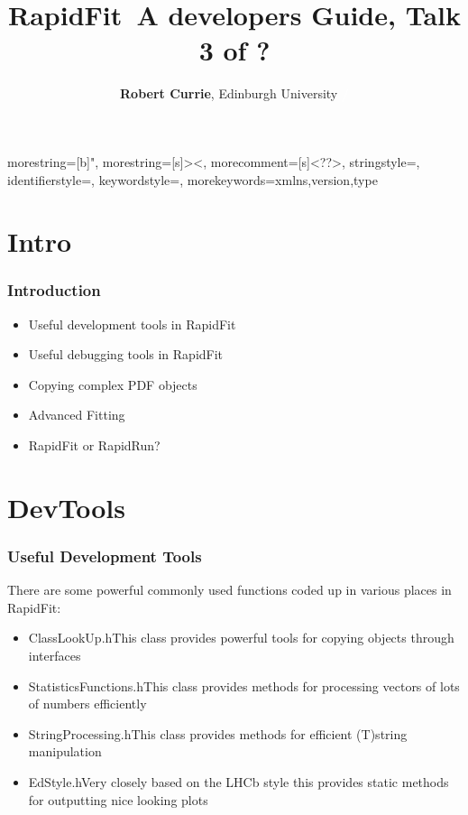 \documentclass{beamer}
\title{\textbf{RapidFit}\newline~A developers Guide, Talk 3 of ?}
\author{\textbf{Robert Currie}, Edinburgh University\newline\hspace{.5cm} \textcolor{white}{\textbf{\insertframenumber \vspace{-.33cm}/ \vspace{-.33cm}\inserttotalframenumber}}}
\date{}
\begin{document}

{
  morestring=[b]",
  morestring=[s]{>}{<},
  morecomment=[s]{<?}{?>},
  stringstyle=\color{black},
  identifierstyle=\color{darkblue},
  keywordstyle=\color{cyan},
  morekeywords={xmlns,version,type}%
}

\begin{frame}
\titlepage
\end{frame}

\section{Intro}

\begin{frame}
 \frametitle{Introduction}
 \begin{itemize}
    \item Useful development tools in RapidFit
    \item Useful debugging tools in RapidFit
    \item Copying complex PDF objects
    \item Advanced Fitting
    \item RapidFit or RapidRun?
 \end{itemize}
\end{frame}

\section{DevTools}

\begin{frame}
 \frametitle{Useful Development Tools}
 There are some powerful commonly used functions coded up in various places in RapidFit:
 \begin{itemize}
   \item \textrm{ClassLookUp.h}\newline This class provides powerful tools for copying objects through interfaces
   \item \textrm{StatisticsFunctions.h}\newline This class provides methods for processing vectors of lots of numbers efficiently
   \item \textrm{StringProcessing.h}\newline This class provides methods for efficient (T)string manipulation
   \item \textrm{EdStyle.h}\newline Very closely based on the LHCb style this provides static methods for outputting nice looking plots
 \end{itemize}
\end{frame}
\end{document}
